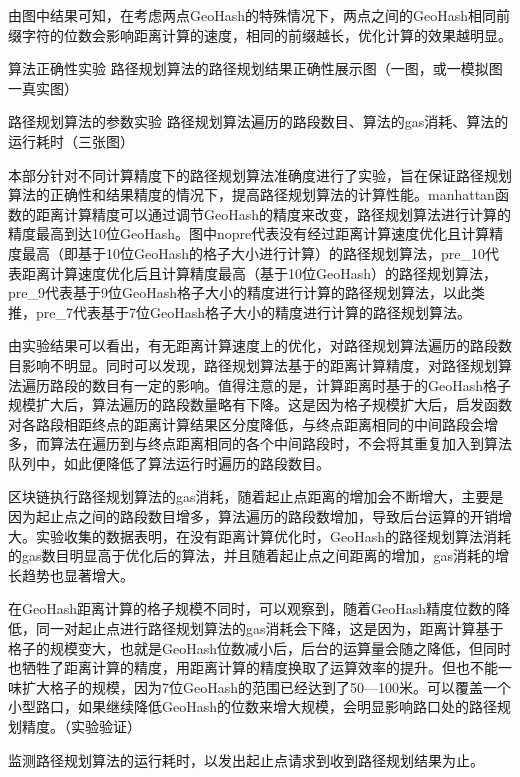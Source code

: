 由图中结果可知，在考虑两点GeoHash的特殊情况下，两点之间的GeoHash相同前缀字符的位数会影响距离计算的速度，相同的前缀越长，优化计算的效果越明显。



算法正确性实验
  路径规划算法的路径规划结果正确性展示图（一图，或一模拟图一真实图）



路径规划算法的参数实验
  路径规划算法遍历的路段数目、算法的gas消耗、算法的运行耗时（三张图）

  本部分针对不同计算精度下的路径规划算法准确度进行了实验，旨在保证路径规划算法的正确性和结果精度的情况下，提高路径规划算法的计算性能。manhattan函数的距离计算精度可以通过调节GeoHash的精度来改变，路径规划算法进行计算的精度最高到达10位GeoHash。图中nopre代表没有经过距离计算速度优化且计算精度最高（即基于10位GeoHash的格子大小进行计算）的路径规划算法，pre_10代表距离计算速度优化后且计算精度最高（基于10位GeoHash）的路径规划算法，pre_9代表基于9位GeoHash格子大小的精度进行计算的路径规划算法，以此类推，pre_7代表基于7位GeoHash格子大小的精度进行计算的路径规划算法。

  由实验结果可以看出，有无距离计算速度上的优化，对路径规划算法遍历的路段数目影响不明显。同时可以发现，路径规划算法基于的距离计算精度，对路径规划算法遍历路段的数目有一定的影响。值得注意的是，计算距离时基于的GeoHash格子规模扩大后，算法遍历的路段数量略有下降。这是因为格子规模扩大后，启发函数对各路段相距终点的距离计算结果区分度降低，与终点距离相同的中间路段会增多，而算法在遍历到与终点距离相同的各个中间路段时，不会将其重复加入到算法队列中，如此便降低了算法运行时遍历的路段数目。



  区块链执行路径规划算法的gas消耗，随着起止点距离的增加会不断增大，主要是因为起止点之间的路段数目增多，算法遍历的路段数增加，导致后台运算的开销增大。实验收集的数据表明，在没有距离计算优化时，GeoHash的路径规划算法消耗的gas数目明显高于优化后的算法，并且随着起止点之间距离的增加，gas消耗的增长趋势也显著增大。

  ​在GeoHash距离计算的格子规模不同时，可以观察到，随着GeoHash精度位数的降低，同一对起止点进行路径规划算法的gas消耗会下降，这是因为，距离计算基于格子的规模变大，也就是GeoHash位数减小后，后台的运算量会随之降低，但同时也牺牲了距离计算的精度，用距离计算的精度换取了运算效率的提升。但也不能一味扩大格子的规模，因为7位GeoHash的范围已经达到了50—100米。可以覆盖一个小型路口，如果继续降低GeoHash的位数来增大规模，会明显影响路口处的路径规划精度。（实验验证）

  监测路径规划算法的运行耗时，以发出起止点请求到收到路径规划结果为止。

